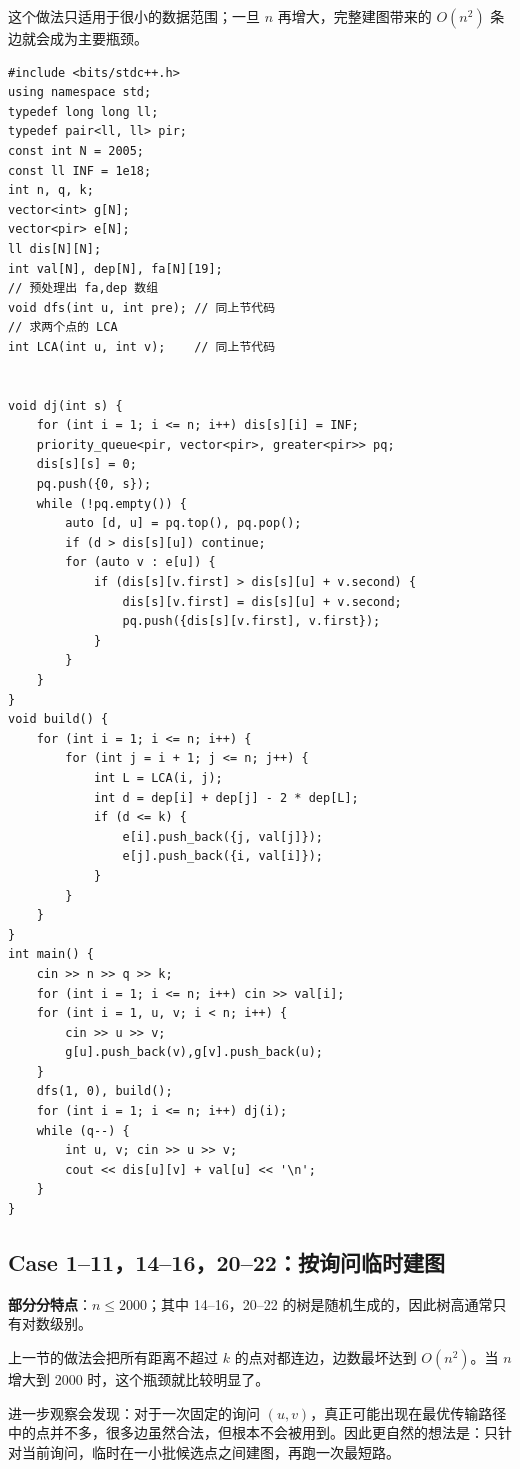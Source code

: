 \documentclass{book}
\begin{document}
    这个做法只适用于很小的数据范围；一旦 $n$ 再增大，完整建图带来的 $O(n^2)$ 条边就会成为主要瓶颈。
\begin{lstlisting}[style = code]
#include <bits/stdc++.h>
using namespace std;
typedef long long ll;
typedef pair<ll, ll> pir;
const int N = 2005;
const ll INF = 1e18;
int n, q, k;
vector<int> g[N];
vector<pir> e[N];
ll dis[N][N];
int val[N], dep[N], fa[N][19];
// 预处理出 fa,dep 数组
void dfs(int u, int pre); // 同上节代码
// 求两个点的 LCA
int LCA(int u, int v);    // 同上节代码


void dj(int s) {
    for (int i = 1; i <= n; i++) dis[s][i] = INF;
    priority_queue<pir, vector<pir>, greater<pir>> pq;
    dis[s][s] = 0;
    pq.push({0, s});
    while (!pq.empty()) {
        auto [d, u] = pq.top(), pq.pop();
        if (d > dis[s][u]) continue;
        for (auto v : e[u]) {
            if (dis[s][v.first] > dis[s][u] + v.second) {
                dis[s][v.first] = dis[s][u] + v.second;
                pq.push({dis[s][v.first], v.first});
            }
        }
    }
}
void build() {
    for (int i = 1; i <= n; i++) {
        for (int j = i + 1; j <= n; j++) {
            int L = LCA(i, j);
            int d = dep[i] + dep[j] - 2 * dep[L];
            if (d <= k) {
                e[i].push_back({j, val[j]});
                e[j].push_back({i, val[i]});
            }
        }
    }
}
int main() {
    cin >> n >> q >> k;
    for (int i = 1; i <= n; i++) cin >> val[i];
    for (int i = 1, u, v; i < n; i++) {
        cin >> u >> v;
        g[u].push_back(v),g[v].push_back(u);
    }
    dfs(1, 0), build();
    for (int i = 1; i <= n; i++) dj(i);
    while (q--) {
        int u, v; cin >> u >> v;
        cout << dis[u][v] + val[u] << '\n';
    }
}
\end{lstlisting}
\newpage

\subsection{Case 1--11，14--16，20--22：按询问临时建图}
 \textbf{部分分特点}：$n\le 2000$；其中 14--16，20--22 的树是随机生成的，因此树高通常只有对数级别。

上一节的做法会把所有距离不超过 $k$ 的点对都连边，边数最坏达到 $O(n^2)$。当 $n$ 增大到 $2000$ 时，这个瓶颈就比较明显了。

进一步观察会发现：对于一次固定的询问 $(u,v)$，真正可能出现在最优传输路径中的点并不多，很多边虽然合法，但根本不会被用到。因此更自然的想法是：只针对当前询问，临时在一小批候选点之间建图，再跑一次最短路。
\end{document}
